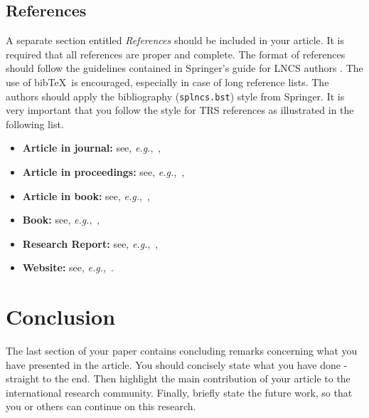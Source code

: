 \documentclass{llncs}
\begin{document}



\subsection{References}
A separate section entitled {\it References} should be included in your article.
It is required that all references are proper and complete. The format of references should follow the guidelines contained in Springer's guide for LNCS authors \cite{springer}. The use of bib\TeX ~is encouraged, especially in case of long reference lists. The authors should apply the bibliography (\verb|splncs.bst|) style from Springer.
It is very important that you follow the style for TRS references as illustrated in the following list.

  \begin{itemize}
  \item {\bf Article in journal:} see, {\em e.g.},~\cite{2D,rs0,rs1,rs2,rs3,RS,PH06,keywords},
  \item {\bf Article in proceedings:} see, {\em e.g.},~\cite{approxSpace},
  \item {\bf Article in book:} see, {\em e.g.},~\cite{bookArt02,bookArt03,bookArt01},
  \item {\bf Book:} see, {\em e.g.},~\cite{graphics,math,companion,book03,book01,book02,Rubinstein81,SB1},
  \item {\bf Research Report:} see, {\em e.g.},~\cite{objects,mBjfPimage},
  \item {\bf Website:}  see, {\em e.g.},~\cite{alg2e,IRSS,eps,knuth05,miktex,texmanual,RSDS,springer,texcenter,TRS,website}.
  \end{itemize}


\section{Conclusion}\label{summary}
The last section of your paper contains concluding remarks concerning what you have presented in the article.  You should concisely state what you have done - straight to the end.  Then highlight the main contribution of your article to the international research community.  Finally, briefly state the future work, so that you or others can continue on this research.
\end{document}
